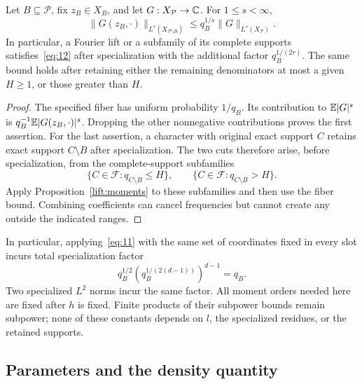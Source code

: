\begin{lemma}
\label{lift:specialization}
Let \(B\subseteq\mathcal P\), fix \(z_B\in X_B\), and let
\(G:X_{\mathcal P}\to\mathbb C\).  For \(1\le s<\infty\),
\[
 \|G(z_B,\cdot)\|_{L^s(X_{\mathcal P\setminus B})}
 \le q_B^{1/s}\|G\|_{L^s(X_{\mathcal P})}.
\]
In particular, a Fourier lift or a subfamily of its complete supports
satisfies~\eqref{eq:12} after specialization with the additional factor
\(q_B^{1/(2r)}\).  The same bound holds after retaining either the
remaining denominators at most a given \(H\ge1\), or those greater
than \(H\).
\end{lemma}

\begin{proof}
The specified fiber has uniform probability \(1/q_B\).  Its contribution
to \(\mathbb E|G|^s\) is
\(q_B^{-1}\mathbb E|G(z_B,\cdot)|^s\).  Dropping the other nonnegative
contributions proves the first assertion.  For the last assertion,
a character with original exact support \(C\) retains exact support
\(C\setminus B\) after specialization.  The two cuts therefore arise,
before specialization, from the complete-support subfamilies
\[
 \{C\in\mathcal F:q_{C\setminus B}\le H\},
 \qquad
 \{C\in\mathcal F:q_{C\setminus B}>H\}.
\]
Apply Proposition~\ref{lift:moments} to these subfamilies and then use
the fiber bound.  Combining coefficients can cancel frequencies but
cannot create any outside the indicated ranges.
\end{proof}

In particular, applying~\eqref{eq:11} with the same set of coordinates
fixed in every slot incurs total specialization factor
\[
 q_B^{1/2}\left(q_B^{1/(2(d-1))}\right)^{d-1}=q_B.
\]
Two specialized \(L^2\) norms incur the same factor.  All moment orders
needed here are fixed after \(h\) is fixed.  Finite products of their
subpower bounds remain subpower; none of these constants depends on
\(l\), the specialized residues, or the retained supports.

\subsection{Parameters and the density quantity}

